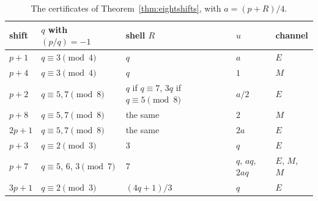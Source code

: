 \begin{center}\small
\begin{longtable}{@{}lllll@{}}
\caption{The certificates of Theorem~\ref{thm:eightshifts}, with $a=(p+R)/4$.}\label{tab:eightshifts}\\
\toprule
shift & $q$ with $(p/q)=-1$ & shell $R$ & $u$ & channel\\
\midrule
$p+1$ & $q\equiv3\pmod4$ & $q$ & $a$ & $E$\\
$p+4$ & $q\equiv3\pmod4$ & $q$ & $1$ & $M$\\
$p+2$ & $q\equiv5,7\pmod8$ & $q$ if $q\equiv7$, $3q$ if $q\equiv5\pmod 8$ & $a/2$ & $E$\\
$p+8$ & $q\equiv5,7\pmod8$ & the same & $2$ & $M$\\
$2p+1$ & $q\equiv5,7\pmod8$ & the same & $2a$ & $E$\\
$p+3$ & $q\equiv2\pmod3$ & $3$ & $q$ & $E$\\
$p+7$ & $q\equiv5$, $6$, $3\pmod7$ & $7$ & $q$, $aq$, $2aq$ & $E$, $M$, $M$\\
$3p+1$ & $q\equiv2\pmod3$ & $(4q+1)/3$ & $q$ & $E$\\
\bottomrule
\end{longtable}
\end{center}

